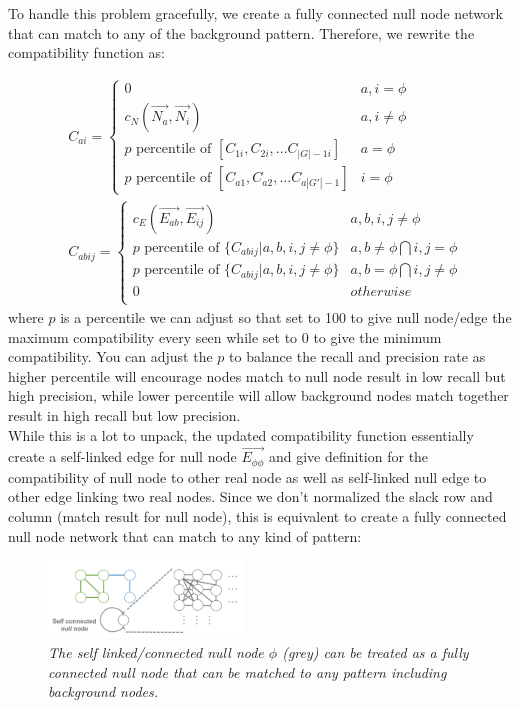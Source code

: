 To handle this problem gracefully, we create a fully connected null node network that can match to any of the background pattern. Therefore, we rewrite the compatibility function as:

\begin{align} 
& C_{ai}  = \begin{cases}
0 & a,i=\phi \\
c_N(\overrightarrow{N_{a}},\overrightarrow{N_{i}}) & a, i\neq\phi \\
p \text{ percentile of }[C_{1i}, C_{2i},...C_{|G|-1i}] & a=\phi\\
p \text{ percentile of }[C_{a1}, C_{a2},...C_{a|G'|-1}] & i=\phi
\end{cases}\\
& C_{abij} = \begin{cases}
c_E(\overrightarrow{E_{ab}},\overrightarrow{E_{ij}})  & a,b,i,j\neq\phi \\
p \text{ percentile of }\{C_{abij}|a,b,i,j\neq\phi\} & a,b\neq\phi \bigcap i,j=\phi\\
p \text{ percentile of }\{C_{abij}|a,b,i,j\neq\phi\} & a,b=\phi \bigcap i,j\neq\phi\\
0 & otherwise\\
\end{cases}
\end{align}
where $p$ is a percentile we can adjust so that set to 100 to give null node/edge the maximum compatibility every seen while set to 0 to give the minimum compatibility. You can adjust the $p$ to balance the recall and precision rate as higher percentile will encourage nodes match to null node result in low recall but high precision, while lower percentile will allow background nodes match together result in high recall but low precision.\\

While this is a lot to unpack, the updated compatibility function essentially create a self-linked edge for null node $\overrightarrow{E_{\phi\phi}}$ and give definition for the compatibility of null node to other real node as well as self-linked null edge to other edge linking two real nodes. Since we don't normalized the slack row and column (match result for null node), this is equivalent to create a fully connected null node network that can match to any kind of pattern:

\begin{figure}[h]
	\centering
	\captionsetup{justification=centering}
	\includegraphics[width=0.46\textwidth]{figs/null_node_network.png}
	\caption[Caption for LOF]{\emph{The self linked/connected null node $\phi$ (grey) can be treated as a fully connected null node that can be matched to any pattern including background nodes. }}
	\label{fig:null_node_network}
\end{figure}

